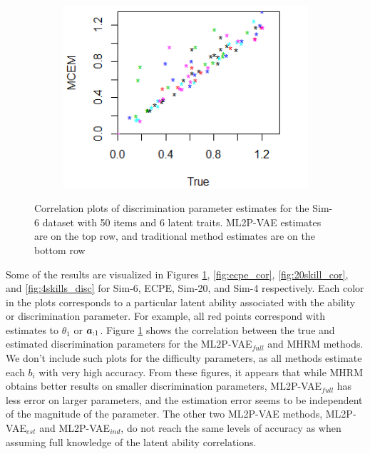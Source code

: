 \begin{figure}[h]
\begin{subfigure}{.32\textwidth}
    \end{subfigure}
    \begin{subfigure}{.32\textwidth}
      \centering
      \includegraphics[width=.9\linewidth]{img/ml_journal_results/6skills/mcem_disc_6skills.png}
    \end{subfigure}
    \caption{Correlation plots of discrimination parameter estimates for the Sim-6 dataset with 50 items and 6 latent traits. ML2P-VAE estimates are on the top row, and traditional method estimates are on the bottom row}
    \label{fig:6skill_cor}
\end{figure}

Some of the results are visualized in Figures \ref{fig:6skill_cor}, \ref{fig:ecpe_cor}, \ref{fig:20skill_cor}, and \ref{fig:4skills_disc} for Sim-6, ECPE, Sim-20, and Sim-4 respectively. Each color in the plots corresponds to a particular latent ability associated with the ability or discrimination parameter. For example, all red points correspond with estimates to $\theta_1$ or $\boldsymbol{a}_{:1}$. Figure \ref{fig:6skill_cor} shows the correlation between the true and estimated discrimination parameters for the ML2P-VAE$_{full}$ and MHRM methods. We don't include such plots for the difficulty parameters, as all methods estimate each $b_i$ with very high accuracy. From these figures, it appears that while MHRM obtains better results on smaller discrimination parameters, ML2P-VAE$_{full}$ has less error on larger parameters, and the estimation error seems to be independent of the magnitude of the parameter. The other two ML2P-VAE methods, ML2P-VAE$_{est}$ and ML2P-VAE$_{ind}$, do not reach the same levels of accuracy as when assuming full knowledge of the latent ability correlations. 

